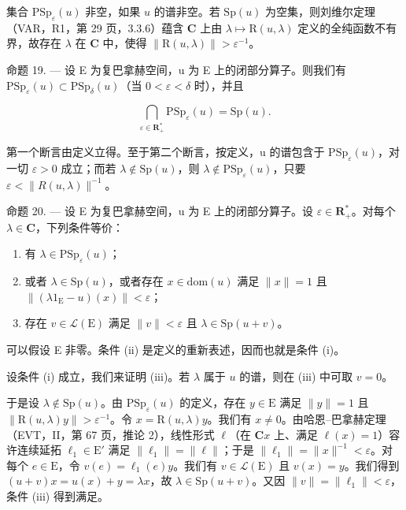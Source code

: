 集合 \(\mathrm{PSp}_{\varepsilon}(u)\) 非空，如果 \(u\) 的谱非空。若 \(\mathrm{Sp}(u)\) 为空集，则刘维尔定理（VAR，R1，第 29 页，3.3.6）蕴含 \(\mathbf{C}\) 上由 \(\lambda \mapsto \mathrm{R}(u,\lambda)\) 定义的全纯函数不有界，故存在 \(\lambda\) 在 \(\mathbf{C}\) 中，使得 \(\| \mathrm{R}(u,\lambda)\| >\varepsilon^{-1}\)。

命题 19. --- 设 E 为复巴拿赫空间，u 为 E 上的闭部分算子。则我们有 \(\mathrm{PSp}_{\varepsilon}(u) \subset \mathrm{PSp}_{\delta}(u)\)（当 \(0 < \varepsilon < \delta\) 时），并且

\[
\bigcap_ {\varepsilon \in \mathbf {R} _ {+} ^ {*}} \mathrm{PSp} _ {\varepsilon} (u) = \mathrm{Sp} (u).
\]

第一个断言由定义立得。至于第二个断言，按定义，u 的谱包含于 \(\mathrm{PSp}_{\varepsilon}(u)\)，对一切 \(\varepsilon > 0\) 成立；而若 \(\lambda \notin \mathrm{Sp}(u)\)，则 \(\lambda \notin \mathrm{PSp}_{\varepsilon}(u)\)，只要 \(\varepsilon < \|R(u, \lambda)\|^{-1}\)。

命题 20. --- 设 E 为复巴拿赫空间，u 为 E 上的闭部分算子。设 \(\varepsilon\in\mathbf{R}_{+}^{*}\)。对每个 \(\lambda\in\mathbf{C}\)，下列条件等价：

\begin{enumerate}
\def\labelenumi{(\roman{enumi})}
\item
  有 \(\lambda \in \mathrm{PSp}_{\varepsilon}(u)\)；
\item
  或者 \(\lambda \in \mathrm{Sp}(u)\)，或者存在 \(x \in \mathrm{dom}(u)\) 满足 \(\| x \| = 1\) 且 \(\| (\lambda 1_{\mathrm{E}} - u)(x) \| < \varepsilon\)；
\item
  存在 \(v \in \mathcal{L}(\mathrm{E})\) 满足 \(\| v \| < \varepsilon\) 且 \(\lambda \in \mathrm{Sp}(u + v)\)。
\end{enumerate}

可以假设 E 非零。条件 (ii) 是定义的重新表述，因而也就是条件 (i)。

设条件 (i) 成立，我们来证明 (iii)。若 \(\lambda\) 属于 \(u\) 的谱，则在 (iii) 中可取 \(v = 0\)。

于是设 \(\lambda \notin \mathrm{Sp}(u)\)。由 \(\mathrm{PSp}_{\varepsilon}(u)\) 的定义，存在 \(y \in \mathrm{E}\) 满足 \(\| y \| = 1\) 且 \(\| \mathrm{R}(u, \lambda)y \| > \varepsilon^{-1}\)。令 \(x = \mathrm{R}(u, \lambda)y\)。我们有 \(x \neq 0\)。由哈恩–巴拿赫定理（EVT，II，第 67 页，推论 2），线性形式 \(\ell\)（在 \(\mathbf{C}x\) 上、满足 \(\ell(x) = 1\)）容许连续延拓 \(\ell_1 \in \mathrm{E}'\) 满足 \(\| \ell_1 \| = \| \ell \|\)；于是 \(\| \ell_1 \| = \| x \|^{-1} < \varepsilon\)。对每个 \(e \in \mathrm{E}\)，令 \(v(e) = \ell_1(e)y\)。我们有 \(v \in \mathcal{L}(\mathrm{E})\) 且 \(v(x) = y\)。我们得到 \((u + v)x = u(x) + y = \lambda x\)，故 \(\lambda \in \mathrm{Sp}(u + v)\)。又因 \(\| v \| = \| \ell_1 \| < \varepsilon\)，条件 (iii) 得到满足。

